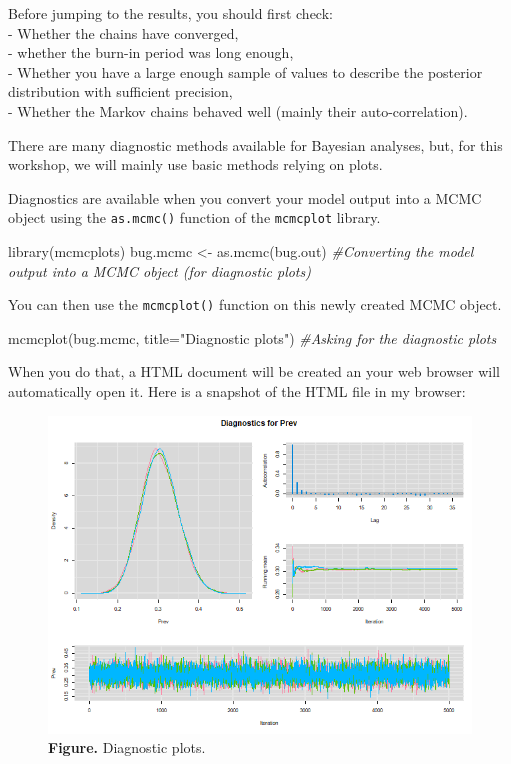 \documentclass[
]{book}
\newenvironment{Shaded}{\begin{snugshade}}{\end{snugshade}}
\newcommand{\AttributeTok}[1]{\textcolor[rgb]{0.77,0.63,0.00}{#1}}
\newcommand{\CommentTok}[1]{\textcolor[rgb]{0.56,0.35,0.01}{\textit{#1}}}
\newcommand{\FunctionTok}[1]{\textcolor[rgb]{0.00,0.00,0.00}{#1}}
\newcommand{\NormalTok}[1]{#1}
\newcommand{\OtherTok}[1]{\textcolor[rgb]{0.56,0.35,0.01}{#1}}
\newcommand{\StringTok}[1]{\textcolor[rgb]{0.31,0.60,0.02}{#1}}
\begin{document}
Before jumping to the results, you should first check:\\
- Whether the chains have converged,\\
- whether the burn-in period was long enough,\\
- Whether you have a large enough sample of values to describe the
posterior distribution with sufficient precision,\\
- Whether the Markov chains behaved well (mainly their
auto-correlation).

There are many diagnostic methods available for Bayesian analyses, but,
for this workshop, we will mainly use basic methods relying on plots.

Diagnostics are available when you convert your model output into a MCMC
object using the \texttt{as.mcmc()} function of the \texttt{mcmcplot}
library.

\begin{Shaded}
\begin{Highlighting}[]
\FunctionTok{library}\NormalTok{(mcmcplots)}
\NormalTok{bug.mcmc }\OtherTok{\textless{}{-}} \FunctionTok{as.mcmc}\NormalTok{(bug.out)          }\CommentTok{\#Converting the model output into a MCMC object (for diagnostic plots)}
\end{Highlighting}
\end{Shaded}

You can then use the \texttt{mcmcplot()} function on this newly created
MCMC object.

\begin{Shaded}
\begin{Highlighting}[]
\FunctionTok{mcmcplot}\NormalTok{(bug.mcmc, }\AttributeTok{title=}\StringTok{"Diagnostic plots"}\NormalTok{)        }\CommentTok{\#Asking for the diagnostic plots}
\end{Highlighting}
\end{Shaded}

When you do that, a HTML document will be created an your web browser
will automatically open it. Here is a snapshot of the HTML file in my
browser:

\begin{figure}
\centering
\includegraphics{Figures/Nice chains RM.png}
\caption{\textbf{Figure.} Diagnostic plots.}
\end{figure}
\end{document}
